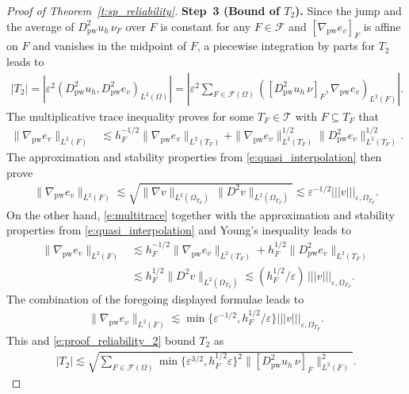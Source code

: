 \documentclass[a4paper]{amsart}
\theoremstyle{definition}
\numberwithin{equation}{section}
\numberwithin{theorem}{section}
\newcommand{\pw}{\mathrm{pw}}
\newcommand{\tri}{\mathcal{T}}
\newcommand{\ennorm}[1]{\lvert\!\lvert\!\lvert #1 \rvert\!\rvert\!\rvert}
\begin{document}
\begin{proof}[Proof of Theorem~\ref{t:sp_reliability}]
    \textbf{Step~3 (Bound of $T_2$).}
    Since the jump and the average of 
    $D^2_\pw u_h\,\nu_F$ over $F$  is constant for any $F\in\mathcal{F}$
    and $[\nabla_\pw e_v]_F$ is affine on $F$ and vanishes in the midpoint of $F$,
    a piecewise integration by parts for $T_2$ leads to
    \begin{align}\label{e:proof_reliability_2}
        |T_2|
        =| \varepsilon^2 (D^2_\pw u_h,D^2_\pw e_v)_{L^2(\Omega)}|
        = \left |\varepsilon^2\sum_{F\in\mathcal{F}(\Omega)}
            ([D^2_\pw u_h\,\nu]_F,\nabla_\pw e_v)_{L^2(F)}
          \right|
          .
    \end{align}
    The multiplicative trace inequality proves for some
    $T_F\in\tri$ with $F\subseteq T_F$ that
    \begin{align}\label{e:multitrace}
        \|\nabla_\pw e_v\|_{L^2(F)}
        &\lesssim h_F^{-1/2} \|\nabla_\pw e_v\|_{L^2(T_F)}
            + \|\nabla_\pw e_v\|_{L^2(T_F)}^{1/2}
                \|D^2_\pw e_v\|_{L^2(T_F)}^{1/2}.
    \end{align}
    The approximation and stability properties from
    \eqref{e:quasi_interpolation} then prove
    \begin{align*}
    \|\nabla_\pw e_v\|_{L^2(F)}
        \lesssim \sqrt{\|\nabla  v\|_{L^2(\Omega_{T_F})} 
                    \,\|D^2  v\|_{L^2(\Omega_{T_F})}}
        \lesssim \varepsilon^{-1/2} \ennorm{v}_{\varepsilon,\Omega_{T_F}}.
    \end{align*}
    On the other hand, \eqref{e:multitrace}
    together with the approximation and stability properties
    from \eqref{e:quasi_interpolation} and Young's inequality 
    leads to
    \begin{align*}
        \|\nabla_\pw e_v\|_{L^2(F)}
        &\lesssim h_F^{-1/2} \lVert \nabla_\pw e_v\rVert_{L^2(T_F)}
           + h_F^{1/2} \lVert D^2_\pw e_v\rVert_{L^2(T_F)}\\
        &\lesssim h_F^{1/2} \lVert D^2 v\rVert_{L^2(\Omega_{T_F})}
        \lesssim (h_F^{1/2}/\varepsilon)\, \ennorm{v}_{\varepsilon,\Omega_{T_F}}.
    \end{align*}
    The combination of the foregoing displayed formulae leads to
    \begin{align}\label{e:proof_reliability_3}
        \|\nabla_\pw e_v\|_{L^2(F)}
        \lesssim \min\{\varepsilon^{-1/2},h_F^{1/2}/\varepsilon\}
        \ennorm{v}_{\varepsilon,\Omega_{T_F}}.
    \end{align}
    This and \eqref{e:proof_reliability_2} bound $T_2$ as
    \begin{align*}
        |T_2|
        \lesssim \sqrt{\sum_{F\in\mathcal{F}(\Omega)}
            \min\{\varepsilon^{3/2},h_F^{1/2}\varepsilon\}^2
               \lVert [D^2_\pw u_h\,\nu]_F\rVert_{L^2(F)}^2}.
    \end{align*}
    

\end{proof}
\end{document}
